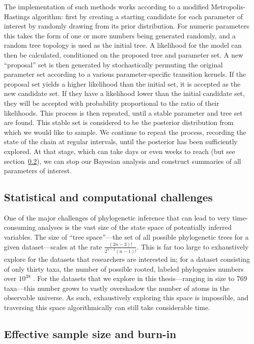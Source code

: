 The implementation of such methods works according to a modified Metropolis-Hastings algorithm: first by creating a starting candidate for each parameter of interest by randomly drawing from its prior distribution.
For numeric parameters this takes the form of one or more numbers being generated randomly, and a random tree topology is used as the initial tree.
A likelihood for the model can then be calculated, conditioned on the proposed tree and parameter set.
A new ``proposal'' set is then generated by stochastically permuting the original parameter set according to a various parameter-specific transition kernels.
If the proposal set yields a higher likelihood than the initial set, it is accepted as the new candidate set.
If they have a likelihood lower than the initial candidate set, they will be accepted with probability proportional to the ratio of their likelihoods.
This process is then repeated, until a stable parameter and tree set are found.
This stable set is considered to be the posterior distribution from which we would like to sample.
We continue to repeat the process, recording the state of the chain at regular intervals, until the posterior has been sufficiently explored.
At that stage, which can take days or even weeks to reach (but see section~\ref{sec:ess}), we can stop our Bayesian analysis and construct summaries of all parameters of interest.

\subsection{Statistical and computational challenges}

One of the major challenges of phylogenetic inference that can lead to very time-consuming analyses is the vast size of the state space of potentially inferred variables.
The size of ``tree space''---the set of all possible phylogenetic trees for a given dataset---scales at the rate $\frac{(2n-3)!}{2^{n-1}(n-1)!}$.
This is far too large to exhaustively explore for the datasets that researchers are interested in; for a dataset consisting of only thirty taxa, the number of possible rooted, labeled phylogenies numbers over $10^{38}$ \cite{felsenstein2003inferring}.
For the datasets that we explore in this thesis---ranging in size to 769 taxa---this number grows to vastly overshadow the number of atoms in the observable universe.
As such, exhaustively exploring this space is impossible, and traversing this space algorithmically can still take considerable time.

\subsection{Effective sample size and burn-in}
\label{sec:ess}

